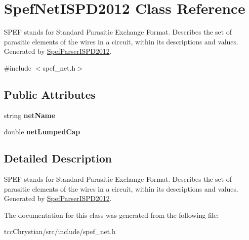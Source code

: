 \hypertarget{classSpefNetISPD2012}{\section{Spef\-Net\-I\-S\-P\-D2012 Class Reference}
\label{classSpefNetISPD2012}
}


S\-P\-E\-F stands for Standard Parasitic Exchange Format. Describes the set of parasitic elements of the wires in a circuit, within its descriptions and values. Generated by \hyperlink{classSpefParserISPD2012}{Spef\-Parser\-I\-S\-P\-D2012}.  




{\ttfamily \#include $<$spef\-\_\-net.\-h$>$}

\subsection*{Public Attributes}
\begin{DoxyCompactItemize}
\item 
\hypertarget{classSpefNetISPD2012_aed87a4b73a2ad09be841c9b8ab222ad5}{string {\bfseries net\-Name}}\label{classSpefNetISPD2012_aed87a4b73a2ad09be841c9b8ab222ad5}

\item 
\hypertarget{classSpefNetISPD2012_ae0a1b7a236104b7a6be70fc977fe20e7}{double {\bfseries net\-Lumped\-Cap}}\label{classSpefNetISPD2012_ae0a1b7a236104b7a6be70fc977fe20e7}

\end{DoxyCompactItemize}


\subsection{Detailed Description}
S\-P\-E\-F stands for Standard Parasitic Exchange Format. Describes the set of parasitic elements of the wires in a circuit, within its descriptions and values. Generated by \hyperlink{classSpefParserISPD2012}{Spef\-Parser\-I\-S\-P\-D2012}. 



The documentation for this class was generated from the following file\-:\begin{DoxyCompactItemize}
\item 
tcc\-Chrystian/src/include/spef\-\_\-net.\-h\end{DoxyCompactItemize}
